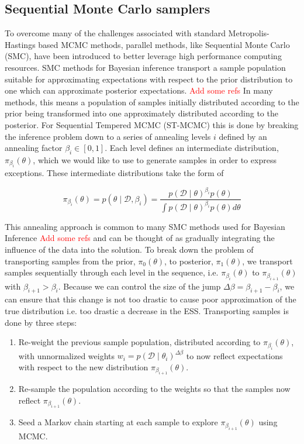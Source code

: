 \documentclass[1p]{article}
\begin{document}
\subsection{Sequential Monte Carlo samplers}
To overcome many of the challenges associated with standard Metropolis-Hastings based MCMC methods, parallel methods, like Sequential Monte Carlo (SMC), have been introduced to better leverage high performance computing resources. SMC methods for Bayesian inference transport a sample population suitable for approximating expectations with respect to the prior distribution to one which can approximate posterior expectations. \textcolor{red}{Add some refs} In many methods, this means a population of samples initially distributed according to the prior being transformed into one approximately distributed according to the posterior. For Sequential Tempered MCMC (ST-MCMC) this is done by breaking the inference problem down to a series of annealing levels $i$ defined by an annealing factor $\beta_i \in \left [0, 1 \right ]$. Each level defines an intermediate distribution, $\pi_{\beta_i}\left (\theta \right )$, which we would like to use to generate samples in order to express exceptions. These intermediate distributions take the form of

\begin{equation}
\pi_{\beta_i}\left (\theta \right ) = p \left (\theta \mid \mathcal{D}, \beta_i \right) = \frac{p \left (\mathcal{D} \mid \theta \right )^{\beta_i} p \left ( \theta \right )}{\int p \left (\mathcal{D} \mid \theta \right )^{\beta_i} p \left ( \theta \right ) d\theta}
\end{equation}

This annealing approach is common to many SMC methods used for Bayesian Inference \textcolor{red}{Add some refs} and can be thought of as gradually integrating the influence of the data into the solution. To break down the problem of transporting samples from the prior, $\pi_0\left (\theta \right )$, to posterior, $\pi_1\left (\theta \right )$, we transport samples sequentially through each level in the sequence, i.e. $\pi_{\beta_i}\left (\theta \right )$ to $\pi_{\beta_{i+1}}\left (\theta \right )$ with $\beta_{i+1} > \beta_{i}$. Because we can control the size of the jump $\Delta \beta = \beta_{i+1}-\beta_i$, we can ensure that this change is not too drastic to cause poor approximation of the true distribution i.e. too drastic a decrease in the ESS. Transporting samples is done by three steps:

\begin{enumerate}
	\item Re-weight the previous sample population, distributed according to $\pi_{\beta_i}\left (\theta \right )$, with unnormalized weights $w_i = p \left (\mathcal{D} \mid \theta_i \right )^{\Delta \beta}$ to now reflect expectations with respect to the new distribution $\pi_{\beta_{i+1}}\left (\theta \right )$.
	\item Re-sample the population according to the weights so that the samples now reflect $\pi_{\beta_{i+1}}\left (\theta \right )$.
	\item Seed a Markov chain starting at each sample to explore $\pi_{\beta_{i+1}}\left (\theta \right )$ using MCMC.
\end{enumerate}
\end{document}
